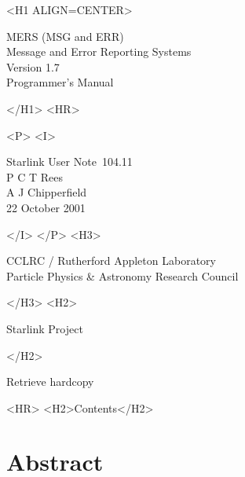 \documentclass[twoside,11pt]{article}
\newcommand{\stardoccategory}  {Starlink User Note}
\newcommand{\stardocsource}    {sun\stardocnumber}
\newcommand{\stardocnumber}    {104.11}
\newcommand{\stardocauthors}   {P C T Rees \\
                                A J Chipperfield}
\newcommand{\stardocdate}      {22 October 2001}
\newcommand{\stardoctitle}     {MERS (MSG and ERR)\\ [1ex]
                                Message and Error Reporting Systems}
\newcommand{\stardocversion}   {Version 1.7}
\newcommand{\stardocmanual}    {Programmer's Manual}
\newcommand{\htmladdnormallink}[2]{#1}
\newcommand{\htmladdimg}[1]{}
\newcommand{\htmlref}[2]{#1}
\newcommand{\htmladdtonavigation}[1]{}
\newcommand{\xlabel}[1]{}
\renewcommand{\_}{\texttt{\symbol{95}}}
\begin{document}
\begin{htmlonly}
   \xlabel{}
   \begin{rawhtml} <H1 ALIGN=CENTER> \end{rawhtml}
      \stardoctitle\\
      \stardocversion\\
      \stardocmanual
   \begin{rawhtml} </H1> <HR> \end{rawhtml}


   \begin{rawhtml} <P> <I> \end{rawhtml}
   \stardoccategory\ \stardocnumber \\
   \stardocauthors \\
   \stardocdate
   \begin{rawhtml} </I> </P> <H3> \end{rawhtml}
      \htmladdnormallink{CCLRC}{http://www.cclrc.ac.uk} /
      \htmladdnormallink{Rutherford Appleton Laboratory}
                        {http://www.cclrc.ac.uk/ral} \\
      \htmladdnormallink{Particle Physics \& Astronomy Research Council}
                        {http://www.pparc.ac.uk} \\
   \begin{rawhtml} </H3> <H2> \end{rawhtml}
      \htmladdnormallink{Starlink Project}{http://www.starlink.rl.ac.uk/}
   \begin{rawhtml} </H2> \end{rawhtml}
   \htmladdnormallink{\htmladdimg{source.gif} Retrieve hardcopy}
      {http://www.starlink.rl.ac.uk/cgi-bin/hcserver?\stardocsource}\\

  \label{stardoccontents}
  \begin{rawhtml} 
    <HR>
    <H2>Contents</H2>
  \end{rawhtml}
  \htmladdtonavigation{\htmlref{\htmladdimg{contents_motif.gif}}
        {stardoccontents}}

  \section{\xlabel{abstract}Abstract}
\end{htmlonly}
\end{document}

